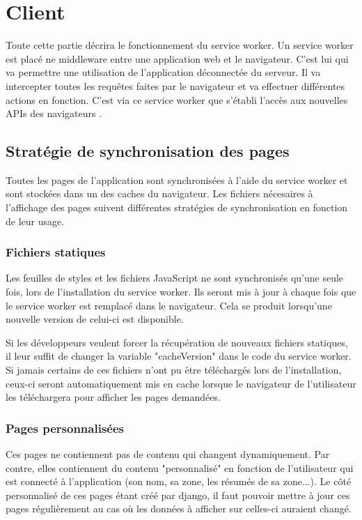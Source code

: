 \documentclass{EPL-master-thesis-covers-FR}
\begin{document}
				
		\section{Client}
			Toute cette partie décrira le fonctionnement du service worker. Un service worker est placé ne middleware entre une application web et le navigateur. C'est lui qui va permettre une utilisation de l'application déconnectée du serveur. Il va intercepter toutes les requêtes faites par le navigateur et va effectuer différentes actions en fonction. C'est via ce service worker que s'établi l'accès aux nouvelles APIs des navigateurs \cite{ref:sw}.
			
			
			\subsection*{Stratégie de synchronisation des pages}			
				Toutes les pages de l'application sont synchronisées à l'aide du service worker et sont stockées dans un des caches du navigateur. Les fichiers nécesaires à l'affichage des pages suivent différentes stratégies de synchronisation en fonction de leur usage.			
				
				\subsubsection*{Fichiers statiques}  
					Les feuilles de styles et les fichiers JavaScript ne sont synchronisés qu'une seule fois, lors de l'installation du service worker. Ils seront mis à jour à chaque fois que le service worker est remplacé dans le navigateur. Cela se produit lorsqu'une nouvelle version de celui-ci est disponible. 
					
					Si les développeurs veulent forcer la récupération de nouveaux fichiers statiques, il leur suffit de changer la variable "cacheVersion" dans le code du service worker. Si jamais certains de ces fichiers n'ont pu être téléchargés lors de l'installation, ceux-ci seront automatiquement mis en cache lorsque le navigateur de l'utilisateur les téléchargera pour afficher les pages demandées.
					
					
				\subsubsection*{Pages personnalisées}				
				 	Ces pages ne contiennent pas de contenu qui changent dynamiquement. Par contre, elles contiennent du contenu "personnalisé" en fonction de l'utilisateur qui est connecté à l'application (son nom, sa zone, les résumés de sa zone...). Le côté personnalisé de ces pages étant créé par \Gls{django}, il faut pouvoir mettre à jour ces pages régulièrement au cas où les données à afficher sur celles-ci auraient changé. 
				 	
\end{document}
